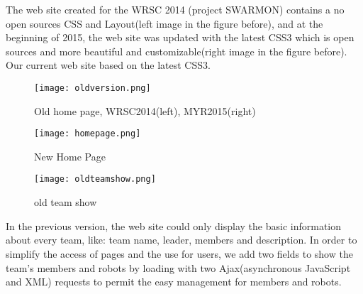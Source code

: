 The web site created for the WRSC 2014 (project SWARMON) contains a no open sources CSS and Layout(left image in the figure before), and at the beginning of 2015, the web site was updated with the latest CSS3 which is open sources and more beautiful and customizable(right image in the figure before). Our current web site based on the latest CSS3.

\begin{figure}[h!]
\centering
\texttt{[image: oldversion.png]}
\caption{Old home page, WRSC2014(left), MYR2015(right) }
\label{fig-sample}
\end{figure}

\begin{figure}[h!]
\centering
\texttt{[image: homepage.png]}
\caption{New Home Page }
\end{figure}

\begin{figure}[h!]
\centering
\texttt{[image: oldteamshow.png]}
\caption{old team show}
\label{fig-sample}
\end{figure}
In the previous version, the web site could only display the basic information about every team, like: team name, leader, members and description. In order to simplify the access of pages and the use for users, we add two fields to show the team's members and robots by loading with two Ajax(asynchronous JavaScript and XML) requests to permit the easy management for members and robots.



